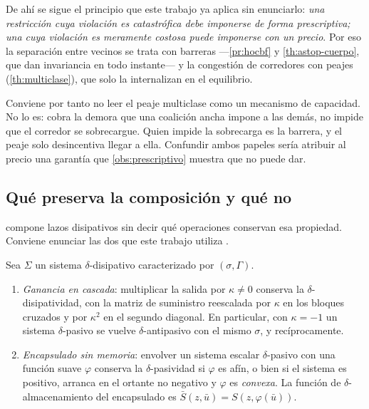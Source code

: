 \begin{observacion}
\label{obs:criterio-restricciones}
De ahí se sigue el principio que este trabajo ya aplica sin enunciarlo: \emph{una
restricción cuya violación es catastrófica debe imponerse de forma prescriptiva;
una cuya violación es meramente costosa puede imponerse con un precio}. Por eso
la separación entre vecinos se trata con barreras —\cref{pr:hocbf} y
\cref{th:astop-cuerpo}, que dan invariancia en todo instante— y la congestión de
corredores con peajes (\cref{th:multiclase}), que solo la internalizan en el
equilibrio.

Conviene por tanto no leer el peaje multiclase como un mecanismo de capacidad.
No lo es: cobra la demora que una coalición ancha impone a las demás, no impide
que el corredor se sobrecargue. Quien impide la sobrecarga es la barrera, y el
peaje solo desincentiva llegar a ella. Confundir ambos papeles sería atribuir al
precio una garantía que \cref{obs:prescriptivo} muestra que no puede dar.
\end{observacion}

\subsection{Qué preserva la composición y qué no}

 compone lazos disipativos sin decir qué operaciones conservan
esa propiedad. Conviene enunciar las dos que este trabajo utiliza
\cite{martinezPiazuelo2025gne}.

\begin{proposicion}
\label{pr:composiciones}
Sea $\Sigma$ un sistema $\delta$-disipativo caracterizado por $(\sigma,\Gamma)$.
\begin{enumerate}[label=(\roman*),leftmargin=2.2em,topsep=0.2em,itemsep=0.15em]
  \item \emph{Ganancia en cascada}: multiplicar la salida por $\kappa\neq0$
  conserva la $\delta$-disipatividad, con la matriz de suministro reescalada por
  $\kappa$ en los bloques cruzados y por $\kappa^{2}$ en el segundo diagonal. En
  particular, con $\kappa=-1$ un sistema $\delta$-pasivo se vuelve
  $\delta$-antipasivo con el mismo $\sigma$, y recíprocamente.
  \item \emph{Encapsulado sin memoria}: envolver un sistema escalar
  $\delta$-pasivo con una función suave $\varphi$ conserva la $\delta$-pasividad
  si $\varphi$ es afín, o bien si el sistema es positivo, arranca en el ortante
  no negativo y $\varphi$ es \emph{convexa}. La función de $\delta$-almacenamiento
  del encapsulado es $\bar S(z,\bar u)=S(z,\varphi(\bar u))$.
\end{enumerate}
\end{proposicion}

